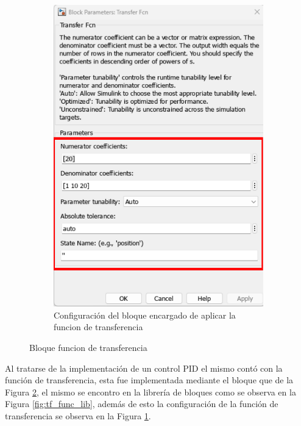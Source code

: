 \begin{figure}[htbp]
\begin{subfigure}[b]{0.45\textwidth}
        \includegraphics[width=\textwidth]{fig/Capitulo5/Caso_de_estudio_PID/config_transfer_function.pdf}
        \caption{Configuración del bloque encargado de aplicar la funcion de transferencia}
        \label{fig:tf_func_conf}
    \end{subfigure}
    \caption{Bloque funcion de transferencia}
    \label{fig:tf_func_block}
\end{figure}

Al tratarse de la implementación de un control PID el mismo contó con la función de transferencia, esta fue implementada mediante el bloque que de la Figura \ref{fig:tf_func_block}, el mismo se encontro en la librería de bloques como se observa en la Figura \ref{fig:tf_func_lib}, además de esto la configuración de la función de transferencia se observa en la Figura \ref{fig:tf_func_conf}.

